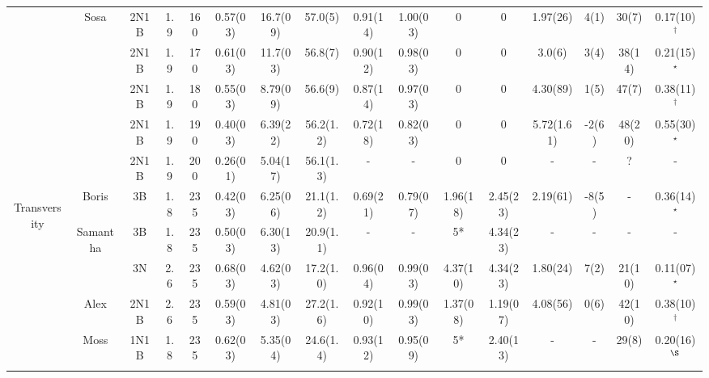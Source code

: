 \documentclass[pdftex,letterpaper,12pt]{report}
\begin{document}
\begin{table}
\begin{center}
\begin{tabular}{|c|c|ccc|ccc|ccccc|cc|c|}
			& \multirow{5}{*}{Sosa} & 2N1B & 1.9 & 160 & 0.57(03) & 16.7(09) & 57.0(5) & 0.91(14) & 1.00(03) & 0 & 0 & 1.97(26) & 4(1) & 30(7) & 0.17(10)$^\dagger$ \\
			&  & 2N1B & 1.9 & 170 & 0.61(03) & 11.7(03) & 56.8(7) & 0.90(12) & 0.98(03) & 0 & 0 & 3.0(6) & 3(4) & 38(14) & 0.21(15)$^\star$ \\
			&  & 2N1B & 1.9 & 180 & 0.55(03) & 8.79(09) & 56.6(9) & 0.87(14) & 0.97(03) & 0 & 0 & 4.30(89) & 1(5) & 47(7) & 0.38(11)$^\dagger$ \\
			&  & 2N1B & 1.9 & 190 & 0.40(03) & 6.39(22) & 56.2(1.2) & 0.72(18) & 0.82(03) & 0 & 0 & 5.72(1.61) & -2(6) & 48(20) & 0.55(30)$^\star$ \\
			&  & 2N1B & 1.9 & 200 & 0.26(01) & 5.04(17) & 56.1(1.3) & - & - & 0 & 0 & - & - & ? & - \\
			\hline
			\hline
			\multirow{12}{*}{\begin{sideways}Transversity\end{sideways}} & Boris & 3B & 1.8 & 235 & 0.42(03) & 6.25(06) & 21.1(1.2) & 0.69(21) & 0.79(07) & 1.96(18) & 2.45(23) & 2.19(61) & -8(5) & - & 0.36(14)$^\star$ \\
			\cline{2-16}
			& \multirow{2}{*}{Samantha} & 3B & 1.8 & 235 & 0.50(03) & 6.30(13) & 20.9(1.1) & - & - & 5* & 4.34(23) & - & - & - & -\\
			& & 3N & 2.6 & 235 & 0.68(03) & 4.62(03) & 17.2(1.0) & 0.96(04) & 0.99(03) & 4.37(10) & 4.34(23) & 1.80(24) & 7(2) & 21(10) & 0.11(07)$^\star$\\
			\cline{2-16}
			& Alex & 2N1B & 2.6 & 235 & 0.59(03) & 4.81(03) & 27.2(1.6) & 0.92(10) & 0.99(03) & 1.37(08) & 1.19(07) & 4.08(56) & 0(6) & 42(10) & 0.38(10)$^\dagger$ \\
			\cline{2-16}
			& Moss & 1N1B & 1.8 & 235 & 0.62(03) & 5.35(04) & 24.6(1.4) & 0.93(12) & 0.95(09) & 5* & 2.40(13) & - & - & 29(8) & 0.20(16)$^\S$\\
			\cline{2-16}

\end{tabular}
\end{center}
\end{table}
\end{document}
